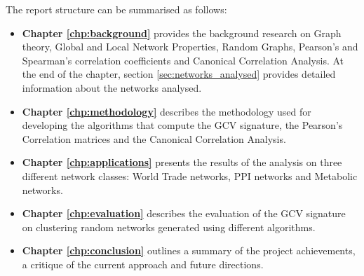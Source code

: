The report structure can be summarised as follows:
\begin{itemize}
 \item \textbf{Chapter \ref{chp:background}} provides the background research on Graph theory, Global and Local Network Properties, Random Graphs, Pearson's and Spearman's correlation coefficients and Canonical Correlation Analysis. At the end of the chapter, section \ref{sec:networks_analysed} provides detailed information about the networks analysed. 
 \item \textbf{Chapter \ref{chp:methodology}} describes the methodology used for developing the algorithms that compute the GCV signature, the Pearson's Correlation matrices and the Canonical Correlation Analysis.
 \item \textbf{Chapter \ref{chp:applications}} presents the results of the analysis on three different network classes: World Trade networks, PPI networks and Metabolic networks. %
 \item \textbf{Chapter \ref{chp:evaluation}} describes the evaluation of the GCV signature on clustering random networks generated using different algorithms.
 \item \textbf{Chapter \ref{chp:conclusion}} outlines a summary of the project achievements, a critique of the current approach and future directions.
\end{itemize}

